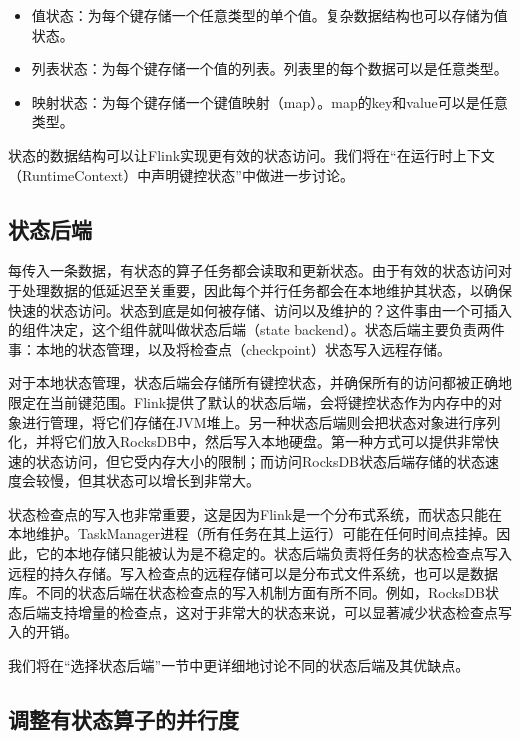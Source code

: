 \documentclass[cn,11pt,chinese]{elegantbook}
\providecommand{\tightlist}{%
  \setlength{\itemsep}{0pt}\setlength{\parskip}{0pt}}
\begin{document}
\begin{itemize}
\tightlist
\item
  值状态：为每个键存储一个任意类型的单个值。复杂数据结构也可以存储为值状态。
\item
  列表状态：为每个键存储一个值的列表。列表里的每个数据可以是任意类型。
\item
  映射状态：为每个键存储一个键值映射（map）。map的key和value可以是任意类型。
\end{itemize}

状态的数据结构可以让Flink实现更有效的状态访问。我们将在``在运行时上下文（RuntimeContext）中声明键控状态''中做进一步讨论。

\hypertarget{ux72b6ux6001ux540eux7aef}{%
\subsection{状态后端}\label{ux72b6ux6001ux540eux7aef}}

每传入一条数据，有状态的算子任务都会读取和更新状态。由于有效的状态访问对于处理数据的低延迟至关重要，因此每个并行任务都会在本地维护其状态，以确保快速的状态访问。状态到底是如何被存储、访问以及维护的？这件事由一个可插入的组件决定，这个组件就叫做状态后端（state
backend）。状态后端主要负责两件事：本地的状态管理，以及将检查点（checkpoint）状态写入远程存储。

对于本地状态管理，状态后端会存储所有键控状态，并确保所有的访问都被正确地限定在当前键范围。Flink提供了默认的状态后端，会将键控状态作为内存中的对象进行管理，将它们存储在JVM堆上。另一种状态后端则会把状态对象进行序列化，并将它们放入RocksDB中，然后写入本地硬盘。第一种方式可以提供非常快速的状态访问，但它受内存大小的限制；而访问RocksDB状态后端存储的状态速度会较慢，但其状态可以增长到非常大。

状态检查点的写入也非常重要，这是因为Flink是一个分布式系统，而状态只能在本地维护。TaskManager进程（所有任务在其上运行）可能在任何时间点挂掉。因此，它的本地存储只能被认为是不稳定的。状态后端负责将任务的状态检查点写入远程的持久存储。写入检查点的远程存储可以是分布式文件系统，也可以是数据库。不同的状态后端在状态检查点的写入机制方面有所不同。例如，RocksDB状态后端支持增量的检查点，这对于非常大的状态来说，可以显著减少状态检查点写入的开销。

我们将在``选择状态后端''一节中更详细地讨论不同的状态后端及其优缺点。

\hypertarget{ux8c03ux6574ux6709ux72b6ux6001ux7b97ux5b50ux7684ux5e76ux884cux5ea6}{%
\subsection{调整有状态算子的并行度}\label{ux8c03ux6574ux6709ux72b6ux6001ux7b97ux5b50ux7684ux5e76ux884cux5ea6}}
\end{document}
